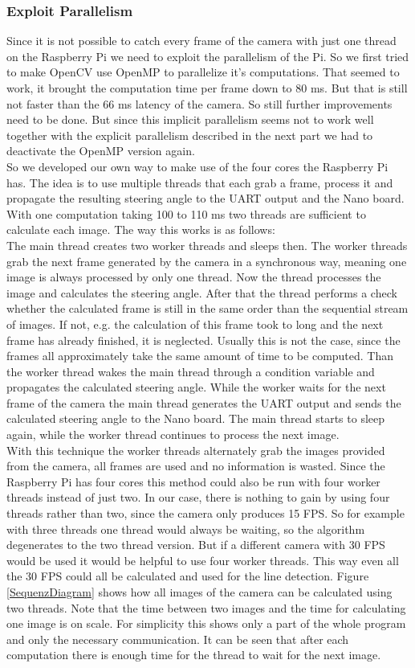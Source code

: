 \documentclass[11pt,twocolumn]{article}
\begin{document}
\subsubsection{Exploit Parallelism}
Since it is not possible to catch every frame of the camera with just one thread on the Raspberry Pi we need to exploit the parallelism of the Pi. So we first tried to make OpenCV use OpenMP to parallelize it's computations. That seemed to work, it brought the computation time per frame down to 80 ms. But that is still not faster than the 66 ms latency of the camera. So still further improvements need to be done. But since this implicit parallelism seems not to work well together with the explicit parallelism described in the next part we had to deactivate the OpenMP version again.\\
So we developed our own way to make use of the four cores the Raspberry Pi has. The idea is to use multiple threads that each grab a frame, process it and propagate the resulting steering angle to the UART output and the Nano board. With one computation taking 100 to 110 ms two threads are sufficient to calculate each image. The way this works is as follows: \\
The main thread creates two worker threads and sleeps then. The worker threads grab the next frame generated by the camera in a synchronous way, meaning one image is always processed by only one thread. Now the thread processes the image and calculates the steering angle. After that the thread performs a check whether the calculated frame is still in the same order than the sequential stream of images. If not, e.g. the calculation of this frame took to long and the next frame has already finished, it is neglected. Usually this is not the case, since the frames all approximately take the same amount of time to be computed. Than the worker thread wakes the main thread through a condition variable and propagates the calculated steering angle. While the worker waits for the next frame of the camera the main thread generates the UART output and sends the calculated steering angle to the Nano board. The main thread starts to sleep again, while the worker thread continues to process the next image.\\
With this technique the worker threads alternately grab the images provided from the camera, all frames are used and no information is wasted. Since the Raspberry Pi has four cores this method could also be run with four worker threads instead of just two. In our case, there is nothing to gain by using four threads rather than two, since the camera only produces 15 FPS. So for example with three threads one thread would always be waiting, so the algorithm degenerates to the two thread version. But if a different camera with 30 FPS would be used it would be helpful to use four worker threads. This way even all the 30 FPS could all be calculated and used for the line detection. Figure \ref{SequenzDiagram} shows how all images of the camera can be calculated using two threads. Note that the time between two images and the time for calculating one image is on scale. For simplicity this shows only a part of the whole program and only the necessary communication. It can be seen that after each computation there is enough time for the thread to wait for the next image.
\end{document}
